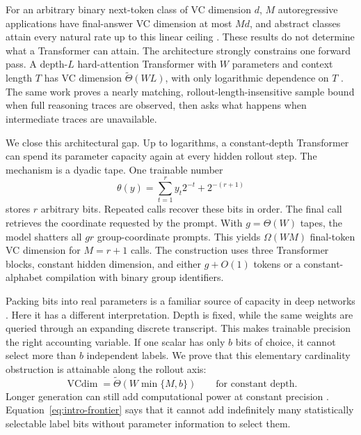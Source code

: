 \documentclass{article}
\newcommand{\1}{\mathbf 1}
\newcommand{\VC}{\operatorname{VCdim}}
\begin{document}
For an arbitrary binary next-token class of VC dimension $d$, $M$ autoregressive applications have final-answer VC dimension at most $Md$, and abstract classes attain every natural rate up to this linear ceiling \citep{joshi2025theory,hanneke2026sample}. These results do not determine what a Transformer can attain. The architecture strongly constrains one forward pass. A depth-$L$ hard-attention Transformer with $W$ parameters and context length $T$ has VC dimension $\widetilde\Theta(WL)$, with only logarithmic dependence on $T$ \citep{yang2026tight}. The same work proves a nearly matching, rollout-length-insensitive sample bound when full reasoning traces are observed, then asks what happens when intermediate traces are unavailable.

We close this architectural gap. Up to logarithms, a constant-depth Transformer can spend its parameter capacity again at every hidden rollout step. The mechanism is a dyadic tape. One trainable number
\begin{equation}
 \theta(y)=\sum_{t=1}^{r}y_t2^{-t}+2^{-(r+1)}
 \label{eq:intro-tape}
\end{equation}
stores $r$ arbitrary bits. Repeated calls recover these bits in order. The final call retrieves the coordinate requested by the prompt. With $g=\Theta(W)$ tapes, the model shatters all $gr$ group-coordinate prompts. This yields $\Omega(WM)$ final-token VC dimension for $M=r+1$ calls. The construction uses three Transformer blocks, constant hidden dimension, and either $g+O(1)$ tokens or a constant-alphabet compilation with binary group identifiers.

Packing bits into real parameters is a familiar source of capacity in deep networks \citep{bartlett2019nearly}. Here it has a different interpretation. Depth is fixed, while the same weights are queried through an expanding discrete transcript. This makes trainable precision the right accounting variable. If one scalar has only $b$ bits of choice, it cannot select more than $b$ independent labels. We prove that this elementary cardinality obstruction is attainable along the rollout axis:
\begin{equation}
 \VC=\widetilde\Theta\!\left(W\min\{M,b\}\right)
 \qquad\text{for constant depth.}
 \label{eq:intro-frontier}
\end{equation}
Longer generation can still add computational power at constant precision \citep{li2024serial}. Equation~\eqref{eq:intro-frontier} says that it cannot add indefinitely many statistically selectable label bits without parameter information to select them.
\end{document}

